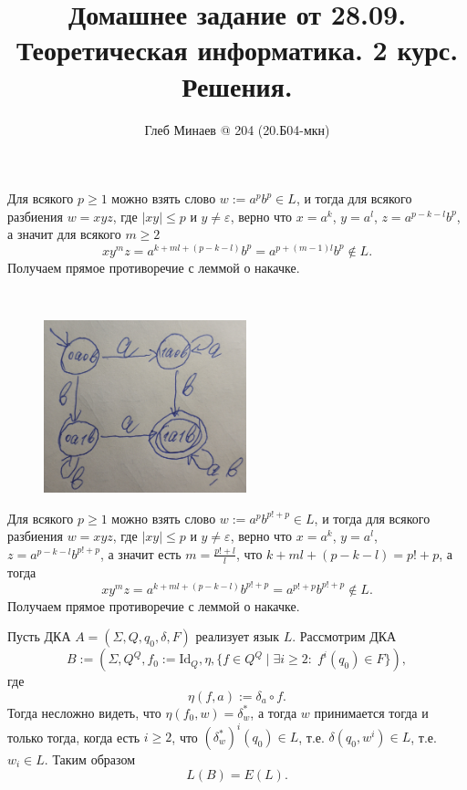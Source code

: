 \documentclass[12pt,a4paper]{article}
\title{Домашнее задание от 28.09.\\Теоретическая информатика. 2 курс.\\Решения.}
\author{Глеб Минаев @ 204 (20.Б04-мкн)}
\newcommand{\Id}{\mathrm{Id}}
\begin{document}
    \maketitle

    \begin{multicols}{2}
        \tableofcontents
    \end{multicols}

    \begin{problem*}[2.3]
        Для всякого $p \geqslant 1$ можно взять слово $w := a^p b^p \in L$, и тогда для всякого разбиения $w = xyz$, где $|xy| \leqslant p$ и $y \neq \varepsilon$, верно что $x = a^k$, $y = a^l$, $z = a^{p-k-l} b^p$, а значит для всякого $m \geqslant 2$
        \[x y^m z = a^{k + ml + (p-k-l)} b^p = a^{p + (m-1)l} b^p \notin L.\]
        Получаем прямое противоречие с леммой о накачке.
    \end{problem*}

    \begin{problem*}[2.4]\ 
        \begin{figure}[H]
            \centering
            \includegraphics[height=5cm]{TI-HW-004-1.jpg}
        \end{figure}
    \end{problem*}

    \begin{problem*}[2.5]
        Для всякого $p \geqslant 1$ можно взять слово $w := a^p b^{p! + p} \in L$, и тогда для всякого разбиения $w = xyz$, где $|xy| \leqslant p$ и $y \neq \varepsilon$, верно что $x = a^k$, $y = a^l$, $z = a^{p-k-l} b^{p! + p}$, а значит есть $m = \frac{p!+l}{l}$, что $k + ml + (p-k-l) = p!+p$, а тогда
        \[x y^m z = a^{k + ml + (p-k-l)} b^{p! + p} = a^{p! + p} b^{p! + p} \notin L.\]
        Получаем прямое противоречие с леммой о накачке.
    \end{problem*}

    \begin{problem*}[4.2]
        Пусть ДКА $A = (\Sigma, Q, q_0, \delta, F)$ реализует язык $L$. Рассмотрим ДКА
        \[B := (\Sigma, Q^Q, f_0 := \Id_Q, \eta, \{f \in Q^Q \mid \exists i \geqslant 2 \colon \; f^i(q_0) \in F\}),\]
        где
        \[\eta(f, a) := \delta_a \circ f.\]
        Тогда несложно видеть, что $\eta(f_0, w) = \delta^*_w$, а тогда $w$ принимается тогда и только тогда, когда есть $i \geqslant 2$, что $(\delta^*_w)^i(q_0) \in L$, т.е. $\delta(q_0, w^i) \in L$, т.е. $w_i \in L$. Таким образом
        \[L(B) = E(L).\]
    \end{problem*}
\end{document}
